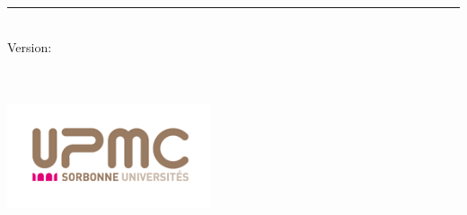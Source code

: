 %
\begin{titlepage}
	\flushright
	\hfill
	\vfill
	{\LARGE\thesisTitle \par}
	\rule[5pt]{\textwidth}{.4pt} \par
	{\Large\thesisName}
	\vfill
	\textit{\large\thesisDate} \\
	Version: \thesisVersion
\end{titlepage}


\begin{titlepage}
	\tgherosfont
	\centering

	{\Huge \thesisUniversity} \\[2mm]
    {\Large \thesisUniversityDepartment} \\[4mm]
	\includegraphics[width=6cm]{gfx/upmc_logo.png} \\[2mm]
	
	\textsf{\large \thesisUniversityGroup} \\
    \textsf{\large \thesisUniversityInstitute} \\

	\vfill
	{\large \thesisSubject} \\[5mm]
	{\LARGE \color{ctcolortitle}\textbf{\thesisTitle} \\[10mm]}
	{\Large \thesisName} \\


\end{titlepage}
